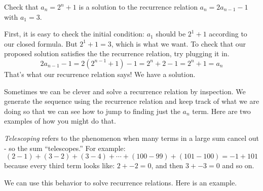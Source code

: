 \documentclass[12pt]{article}
\begin{document}
 \begin{example}
    Check that $a_n = 2^n + 1$ is a solution to the recurrence relation $a_n = 2a_{n-1} - 1$ with $a_1 = 3$. 
    \begin{solution}
      First, it is easy to check the initial condition: $a_1$ should be $2^1 + 1$ according to our closed formula.  But $2^1 + 1 = 3$, which is what we want.  To check that our proposed solution satisfies the the recurrence relation, try plugging it in.
      \[2a_{n-1} - 1 = 2(2^{n-1} + 1) - 1 = 2^n + 2 - 1 = 2^n +1 = a_n\]
      That's what our recurrence relation says!  We have a solution.
    \end{solution}

 \end{example}

 

Sometimes we can be clever and solve a recurrence relation by inspection.  We generate the sequence using the recurrence relation and keep track of what we are doing so that we can see how to jump to finding just the $a_n$ term.  Here are two examples of how you might do that.
%

{\em Telescoping} refers to the phenomenon when many terms in a large sum cancel out - so the sum ``telescopes.''  For example:
\[(2 - 1) + (3 - 2) + (3 - 4) + \cdots + (100 - 99) + (101 - 100) = -1 + 101\]
because every third term looks like: $2 + -2 = 0$, and then $3 + -3 = 0$ and so on.

We can use this behavior to solve recurrence relations.  Here is an example.
\end{document}
